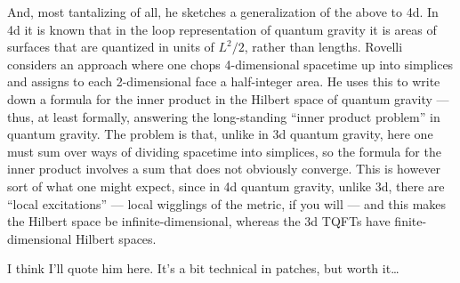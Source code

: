 \documentclass[12pt]{article}
\begin{document}
And, most tantalizing of all, he sketches a generalization of the above
to 4d. In 4d it is known that in the loop representation of quantum
gravity it is areas of surfaces that are quantized in units of
\(L^2/2\), rather than lengths. Rovelli considers an approach where one
chops 4-dimensional spacetime up into simplices and assigns to each
2-dimensional face a half-integer area. He uses this to write down a
formula for the inner product in the Hilbert space of quantum gravity
--- thus, at least formally, answering the long-standing ``inner product
problem'' in quantum gravity. The problem is that, unlike in 3d quantum
gravity, here one must sum over ways of dividing spacetime into
simplices, so the formula for the inner product involves a sum that does
not obviously converge. This is however sort of what one might expect,
since in 4d quantum gravity, unlike 3d, there are ``local excitations''
--- local wigglings of the metric, if you will --- and this makes the
Hilbert space be infinite-dimensional, whereas the 3d TQFTs have
finite-dimensional Hilbert spaces.

I think I'll quote him here. It's a bit technical in patches, but worth
it\ldots{}
\end{document}

